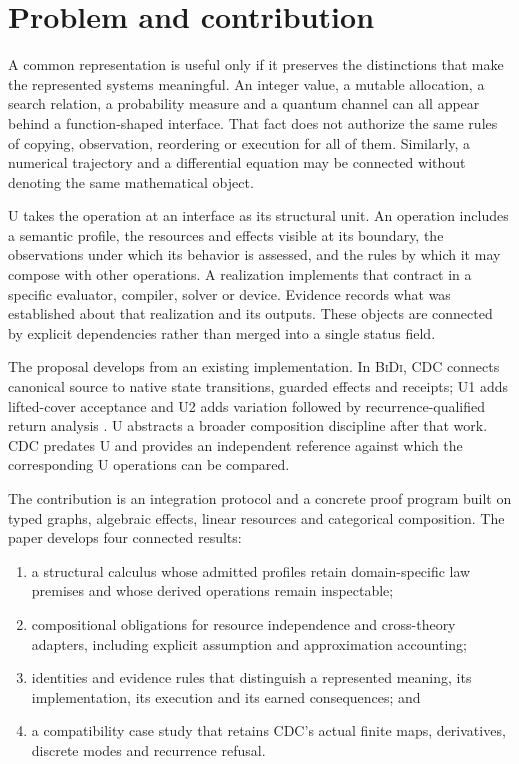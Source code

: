 \documentclass[11pt]{article}
\theoremstyle{remark}
\newcommand{\bidi}{\textsc{BiDi}}
\newcommand{\cdc}{\textsc{CDC}}
\begin{document}
\section{Problem and contribution}

A common representation is useful only if it preserves the distinctions that
make the represented systems meaningful. An integer value, a mutable
allocation, a search relation, a probability measure and a quantum channel can
all appear behind a function-shaped interface. That fact does not authorize
the same rules of copying, observation, reordering or execution for all of
them. Similarly, a numerical trajectory and a differential equation may be
connected without denoting the same mathematical object.

U takes the operation at an interface as its structural unit. An operation
includes a semantic profile, the resources and effects visible at its
boundary, the observations under which its behavior is assessed, and the
rules by which it may compose with other operations. A realization implements
that contract in a specific evaluator, compiler, solver or device. Evidence
records what was established about that realization and its outputs. These
objects are connected by explicit dependencies rather than merged into a
single status field.

The proposal develops from an existing implementation. In
\bidi{}, \cdc{} connects canonical source to native state transitions,
guarded effects and receipts; U1 adds lifted-cover acceptance and U2 adds
variation followed by recurrence-qualified return analysis
\cite{ellis-bidi}. U abstracts a broader composition discipline after that
work. \cdc{} predates U and provides an independent reference against which
the corresponding U operations can be compared.

The contribution is an integration protocol and a concrete proof program
built on typed graphs, algebraic effects, linear resources and categorical
composition. The paper develops four connected results:
\begin{enumerate}
\item a structural calculus whose admitted profiles retain domain-specific
  law premises and whose derived operations remain inspectable;
\item compositional obligations for resource independence and cross-theory
  adapters, including explicit assumption and approximation accounting;
\item identities and evidence rules that distinguish a represented meaning,
  its implementation, its execution and its earned consequences; and
\item a compatibility case study that retains \cdc{}'s actual finite maps,
  derivatives, discrete modes and recurrence refusal.
\end{enumerate}
\end{document}
